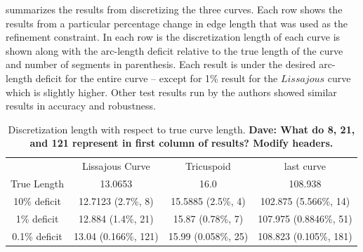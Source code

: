  summarizes the results from discretizing the three 
curves. Each row shows the results from a particular percentage change in edge length that was used as the refinement constraint. In each row is the discretization length of each curve is shown along with the arc-length deficit relative to the true length of the curve and number of segments in parenthesis. Each result is under the desired arc-length deficit for the entire curve -- except for 1\% result for the $Lissajous$ curve which is slightly higher. Other test results run by the authors showed similar results in accuracy and robustness.

\begin{table}[h!] \caption{\label{tab:curvelength} Discretization length 
with respect to true curve length.  {\bf{Dave:  What do 8, 21, and 121 
represent in first column of results?  Modify headers.}}} 
\begin{tabular}{cccc}
 & Lissajous Curve & Tricuspoid & last curve \\
True Length & 13.0653 & 16.0 & 108.938\\
10\% deficit & 12.7123 (2.7\%, 8) & 15.5885 (2.5\%, 4) & 102.875 (5.566\%, 14)\\
1\% deficit & 12.884 (1.4\%, 21) & 15.87 (0.78\%, 7) & 107.975 (0.8846\%, 51)\\
0.1\% deficit & 13.04 (0.166\%, 121) & 15.99 (0.058\%, 25) & 108.823 (0.105\%, 181)
\end{tabular}
\end{table}
